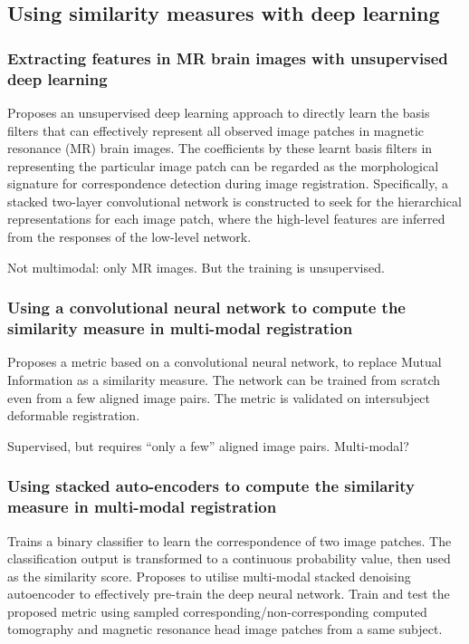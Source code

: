 \documentclass[11pt]{article} %
\begin{document}
  \subsection{Using similarity measures with deep learning \cite{litjens:deeplearning}}
    \subsubsection{Extracting features in MR brain images with unsupervised deep learning \linebreak[4] \cite{wu:features} }
Proposes an unsupervised deep learning approach to directly learn the basis filters that can effectively represent all observed image patches in magnetic resonance (MR) brain images. The coefficients by these learnt basis filters in representing the particular image patch can be regarded as the morphological signature for correspondence detection during image registration. Specifically, a stacked two-layer convolutional network is constructed to seek for the hierarchical representations for each image patch, where the high-level features are inferred from the responses of the low-level network.

Not multimodal: only MR images. But the training is unsupervised.

    \subsubsection{Using a convolutional neural network to compute the similarity measure in multi-modal registration \cite{simonovsky:crossmodalfeatures}}
Proposes a metric based on a convolutional neural network, to replace Mutual Information as a similarity measure. The network can be trained from scratch even from a few aligned image pairs. The metric is validated on intersubject deformable registration.

Supervised, but requires ``only a few'' aligned image pairs. Multi-modal?

    \subsubsection{Using stacked auto-encoders to compute the similarity measure in multi-modal registration \cite{cheng:deepsimilarity}}
Trains a binary classifier to learn the correspondence of two image patches. The classification output is transformed to a continuous probability value, then used as the similarity score. Proposes to utilise multi-modal stacked denoising autoencoder to effectively pre-train the deep neural network. Train and test the proposed metric using sampled corresponding/non-corresponding computed tomography and magnetic resonance head image patches from a same subject.
\end{document}
